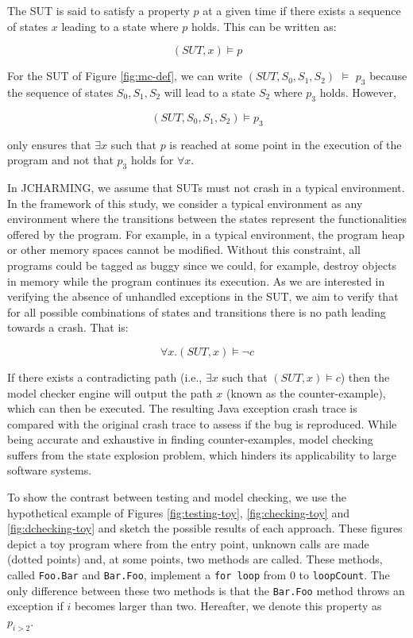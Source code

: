 \documentclass[12pt]{report}
\begin{document}
The SUT is said to satisfy a property \(p\) at a given time if there
exists a sequence of states \(x\) leading to a state where \(p\) holds.
This can be written as:

\begin{equation}
(SUT, x) \models p
\end{equation}

For the SUT of Figure \ref{fig:mc-def}, we can write
\((SUT, {S_0, S_1, S_2})\) \(\models\) \(p_3\) because the sequence of
states \({S_0, S_1, S_2}\) will lead to a state \(S_2\) where \(p_3\)
holds. However,

\begin{equation}
(SUT, S_0, S_1, S_2) \models p_3
\end{equation}

only ensures that \(\exists x\) such that \(p\) is reached at some point
in the execution of the program and not that \(p_3\) holds for
\(\forall x\).

In JCHARMING, we assume that SUTs must not crash in a typical
environment. In the framework of this study, we consider a typical
environment as any environment where the transitions between the states
represent the functionalities offered by the program. For example, in a
typical environment, the program heap or other memory spaces cannot be
modified. Without this constraint, all programs could be tagged as buggy
since we could, for example, destroy objects in memory while the program
continues its execution. As we are interested in verifying the absence
of unhandled exceptions in the SUT, we aim to verify that for all
possible combinations of states and transitions there is no path leading
towards a crash. That is:

\begin{equation}
\forall x.(SUT, x) \models \neg c
\end{equation}

If there exists a contradicting path (i.e., \(\exists x\) such that
\((SUT, x) \models c\)) then the model checker engine will output the
path \(x\) (known as the counter-example), which can then be executed.
The resulting Java exception crash trace is compared with the original
crash trace to assess if the bug is reproduced. While being accurate and
exhaustive in finding counter-examples, model checking suffers from the
state explosion problem, which hinders its applicability to large
software systems.

To show the contrast between testing and model checking, we use the
hypothetical example of Figures \ref{fig:testing-toy},
\ref{fig:checking-toy} and \ref{fig:dchecking-toy} and sketch the
possible results of each approach. These figures depict a toy program
where from the entry point, unknown calls are made (dotted points) and,
at some points, two methods are called. These methods, called
\texttt{Foo.Bar} and \texttt{Bar.Foo}, implement a \texttt{for loop}
from 0 to \texttt{loopCount}. The only difference between these two
methods is that the \texttt{Bar.Foo} method throws an exception if \(i\)
becomes larger than two. Hereafter, we denote this property as
\(p_{i > 2}\).
\end{document}
